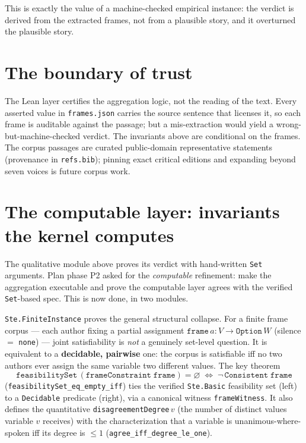 \documentclass[11pt]{article}
\newcommand{\lean}[1]{\texttt{#1}}
\begin{document}
This is exactly the value of a machine-checked empirical instance: the
verdict is derived from the extracted frames, not from a plausible story,
and it overturned the plausible story.

\section{The boundary of trust}

The Lean layer certifies the aggregation logic, not the reading of the
text. Every asserted value in \lean{frames.json} carries the source
sentence that licenses it, so each frame is auditable against the
passage; but a mis-extraction would yield a wrong-but-machine-checked
verdict. The invariants above are conditional on the frames. The corpus
passages are curated public-domain representative statements (provenance
in \lean{refs.bib}); pinning exact critical editions and expanding beyond
seven voices is future corpus work.

\section{The computable layer: invariants the kernel computes}

The qualitative module above proves its verdict with hand-written
\lean{Set} arguments. Plan phase P2 asked for the \emph{computable}
refinement: make the aggregation executable and prove the computable layer
agrees with the verified \lean{Set}-based spec. This is now done, in two
modules.

\lean{Ste.FiniteInstance} proves the general structural collapse. For a
finite frame corpus --- each author fixing a partial assignment
$\lean{frame}\,a : V \to \mathtt{Option}\,W$ (silence $=$ \lean{none}) ---
joint satisfiability is \emph{not} a genuinely set-level question. It is
equivalent to a \textbf{decidable, pairwise} one: the corpus is satisfiable
iff no two authors ever assign the same variable two different values. The
key theorem
\[
  \lean{feasibilitySet}\,(\lean{frameConstraint}\;\lean{frame}) = \varnothing
  \;\Longleftrightarrow\; \neg\,\lean{Consistent}\;\lean{frame}
\]
(\lean{feasibilitySet\_eq\_empty\_iff}) ties the verified \lean{Ste.Basic}
feasibility set (left) to a \lean{Decidable} predicate (right), via a
canonical witness \lean{frameWitness}. It also defines the quantitative
\lean{disagreementDegree}\,$v$ (the number of distinct values variable $v$
receives) with the characterization that a variable is unanimous-where-
spoken iff its degree is $\le 1$ (\lean{agree\_iff\_degree\_le\_one}).
\end{document}
